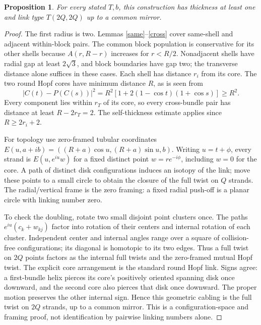 \documentclass[11pt]{article}
\newtheorem{proposition}[theorem]{Proposition}
\begin{document}
\begin{proposition}\label{finite}
For every stated $T,b$, this construction has thickness at least one and
link type $T(2Q,2Q)$ up to a common mirror.
\end{proposition}
\begin{proof}
The first radius is two. Lemmas \ref{same}--\ref{cross} cover same-shell
and adjacent within-block pairs. The common block population is conservative
for its other shells because $A(r,R-r)$ increases for $r<R/2$.
Nonadjacent shells have radial gap at least $2\sqrt3$, and block boundaries
have gap two; the transverse distance alone suffices in these cases.
Each shell has distance $r_i$ from its core. The two round Hopf cores have
minimum distance $R$, as is seen from
\[
|C(t)-P(C(s))|^2=R^2[1+2(1-\cos t)(1+\cos s)]\ge R^2.
\]
Every component lies within $r_T$ of its core, so every cross-bundle pair
has distance at least $R-2r_T=2$. The self-thickness estimate applies since
$R\ge2r_i+2$.

For topology use zero-framed tubular coordinates
$E(u,a+ib)=((R+a)\cos u,(R+a)\sin u,b)$.
Writing $u=t+\phi$, every strand is $E(u,e^{iu}w)$ for a fixed distinct
point $w=r e^{-i\phi}$, including $w=0$ for the core. A path of distinct
disk configurations induces an isotopy of the link; move these points to a
small circle to obtain the closure of the full twist on $Q$ strands.
The radial/vertical frame is the zero framing: a fixed radial push-off is a
planar circle with linking number zero.

To check the doubling, rotate two small disjoint point clusters once.
The paths $e^{iu}(c_k+w_{kj})$ factor into rotation of their centers and
internal rotation of each cluster. Independent center and internal angles
range over a square of collision-free configurations; its diagonal is
homotopic to its two edges. Thus a full twist on $2Q$ points factors as
the internal full twists and the zero-framed mutual Hopf twist.
The explicit core arrangement is the standard round Hopf link. Signs agree:
a first-bundle helix pierces its core's positively oriented spanning disk
once downward, and the second core also pierces that disk once downward.
The proper motion preserves the other internal sign. Hence this geometric
cabling is the full twist on $2Q$ strands, up to a common mirror.
This is a configuration-space and framing proof, not identification by
pairwise linking numbers alone.
\end{proof}
\end{document}
